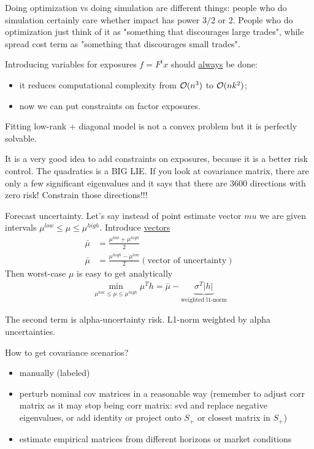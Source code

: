 \begin{idea}
	Doing optimization vs doing simulation are different things: people who do simulation certainly care whether impact has power $3/2$ or $2$. People who do optimization just think of it as "something that discourages large trades", while spread cost term as "something that discourages small trades".
\end{idea}

\begin{idea}
	Introducing variables for exposures $f = F^t x$ should \underline{always} be done:
	\begin{itemize}
		\item it reduces computational complexity from $\mathcal{O}(n^3)$ to $\mathcal{O}(n k^2)$;
		\item now we can put constraints on factor exposures.
	\end{itemize}
\end{idea}

\begin{idea}
	Fitting low-rank + diagonal model is not a convex problem but it is perfectly solvable.
\end{idea}

\begin{idea}
	It is a very good idea to add constraints on exposures, because it is a better risk control. The quadratics is a BIG LIE. If you look at covariance matrix, there are only a few significant eigenvalues and it says that there are 3600 directions with zero risk! Constrain those directions!!!
\end{idea}

\begin{idea}
	Forecast uncertainty. Let's say instead of point estimate vector $mu$ we are given intervals $\mu^{low} \le \mu \le \mu^{high}$. Introduce \underline{vectors}
	\begin{align}
		\bar{\mu} &= \frac{\mu^{low}+\mu^{high}}{2} \\ 
		\bar{\mu} &= \frac{\mu^{high}-\mu^{low}}{2} (\text{vector of uncertainty})
	\end{align}
	Then worst-case $\mu$ is easy to get analytically
	\begin{align}
		\min_{\mu^{low} \le \mu \le \mu^{high}} \mu^T h = \bar{\mu} - \underbrace{\sigma^T |h|}_{\text{weighted l1-norm}}
	\end{align}

The second term is alpha-uncertainty risk. L1-norm weighted by alpha uncertainties.

\end{idea}

\begin{idea}
	How to get covariance scenarios?
	\begin{itemize}
		\item manually (labeled)
		\item perturb nominal cov matrices in a reasonable way (remember to adjust corr matrix as it may stop being corr matrix: svd and replace negative eigenvalues, or add identity or project onto $S_+$ or closest matrix in $S_+$)
		\item estimate empirical matrices from different horizons or market conditions
	\end{itemize}
\end{idea}